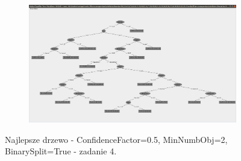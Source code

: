 \documentclass[12pt]{article}
\begin{document}
\clearpage
\begin{figure}[h!]
	\centering
	\begin{subfigure}[b]{1\linewidth}
		\includegraphics[width=\linewidth]{Drzewo_train_sub.png}
	\end{subfigure}
	\label{fig:ChosenNext}
	\caption{Najlepsze drzewo - ConfidenceFactor=0.5, MinNumbObj=2, BinarySplit=True - zadanie 4.}
\end{figure}
\end{document}
